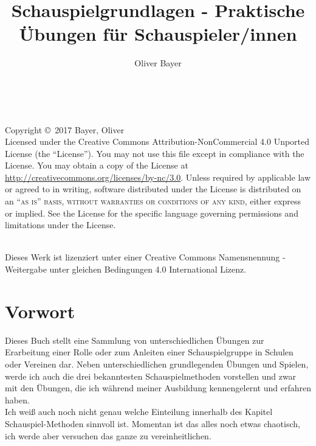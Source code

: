 \documentclass[ngerman, a4paper, twoside]{scrbook}%
\author{Oliver Bayer}
\title{Schauspielgrundlagen - Praktische Übungen für Schauspieler/innen}
\begin{document}
\frontmatter
\maketitle
~\vfill
\thispagestyle{empty}

\noindent Copyright \copyright\ 2017 Bayer, Oliver\\ %



\noindent Licensed under the Creative Commons Attribution-NonCommercial 4.0 Unported License (the ``License''). You may not use this file except in compliance with the License. You may obtain a copy of the License at \url{http://creativecommons.org/licenses/by-nc/3.0}. Unless required by applicable law or agreed to in writing, software distributed under the License is distributed on an \textsc{``as is'' basis, without warranties or conditions of any kind}, either express or implied. See the License for the specific language governing permissions and limitations under the License.\\ %

\begin{center}
	\ccbysa\\

	Dieses Werk ist lizenziert unter einer Creative Commons Namensnennung - Weitergabe unter gleichen Bedingungen 4.0 International Lizenz.
\end{center}

\tableofcontents
	\chapter{Vorwort}
	Dieses Buch stellt eine Sammlung von unterschiedlichen Übungen zur Erarbeitung einer Rolle oder zum Anleiten einer Schauspielgruppe in Schulen oder Vereinen dar. Neben unterschiedlichen grundlegenden Übungen und Spielen, werde ich auch die drei bekanntesten Schauspielmethoden vorstellen und zwar mit den Übungen, die ich während meiner Ausbildung kennengelernt und erfahren haben.\\
	Ich weiß auch noch nicht genau welche Einteilung innerhalb des Kapitel Schauspiel-Methoden sinnvoll ist. Momentan ist das alles noch etwas chaotisch, ich werde aber versuchen das ganze zu vereinheitlichen.\\
\end{document}
